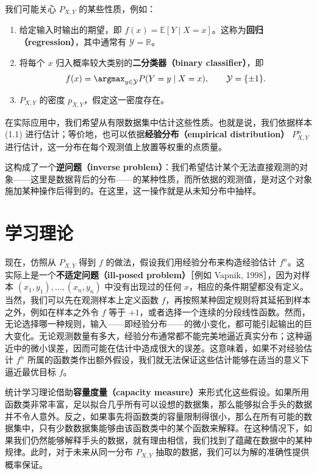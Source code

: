 我们可能关心 $P_{X,Y}$ 的某些性质，例如：
\begin{enumerate}[label=(\roman*)]
 \item 给定输入时输出的期望，即 $f(x)=\mathbb{E}[Y\mid X=x]$。这称为\textbf{回归（regression）}，其中通常有 $\mathcal{Y}=\mathbb{R}$。
 \item 将每个 $x$ 归入概率较大类别的\textbf{二分类器（binary classifier）}，即
 \[
   f(x)=\argmax_{y\in\mathcal{Y}}P(Y=y\mid X=x),
   \qquad \mathcal{Y}=\{\pm1\}.
 \]
 \item $P_{X,Y}$ 的密度 $p_{X,Y}$，假定这一密度存在。
\end{enumerate}
在实际应用中，我们希望从有限数据集中估计这些性质。也就是说，我们依据样本 (1.1) 进行估计；等价地，也可以依据\textbf{经验分布（empirical distribution）} $P^n_{X,Y}$ 进行估计，这一分布在每个观测值上放置等权重的点质量。

这构成了一个\textbf{逆问题（inverse problem）}：我们希望估计某个无法直接观测的对象——这里是数据背后的分布——的某种性质，而所依据的观测值，是对这个对象施加某种操作后得到的。在这里，这一操作就是从未知分布中抽样。

\section{学习理论}
\label{sec:learning-theory}

现在，仿照从 $P_{X,Y}$ 得到 $f$ 的做法，假设我们用经验分布来构造经验估计 $f^n$。这实际上是一个\textbf{不适定问题（ill-posed problem）}［例如 Vapnik, 1998］，因为对样本 $(x_1,y_1),\ldots,(x_n,y_n)$ 中没有出现过的任何 $x$，相应的条件期望都没有定义。当然，我们可以先在观测样本上定义函数 $f$，再按照某种固定规则将其延拓到样本之外，例如在样本之外令 $f$ 等于 $+1$，或者选择一个连续的分段线性函数。然而，无论选择哪一种规则，输入——即经验分布——的微小变化，都可能引起输出的巨大变化。无论观测数量有多大，经验分布通常都不能完美地逼近真实分布；这种逼近中的微小误差，因而可能在估计中造成很大的误差。这意味着，如果不对经验估计 $f^n$ 所属的函数类作出额外假设，我们就无法保证这些估计能够在适当的意义下逼近最优目标 $f$。

统计学习理论借助\textbf{容量度量（capacity measure）}来形式化这些假设。如果所用函数类非常丰富，足以拟合几乎所有可以设想的数据集，那么能够拟合手头的数据并不令人意外。反之，如果事先将函数类的容量限制得很小，那么在所有可能的数据集中，只有少数数据集能够由该函数类中的某个函数来解释。在这种情况下，如果我们仍然能够解释手头的数据，就有理由相信，我们找到了蕴藏在数据中的某种规律。此时，对于未来从同一分布 $P_{X,Y}$ 抽取的数据，我们可以为解的准确性提供概率保证。

